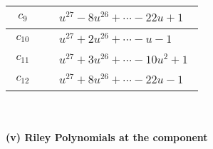 \documentclass[1p]{elsarticle_modified}
\theoremstyle{definition}
\begin{document}
\begin{tabular}{m{50pt}|m{274pt}}
\hline $$\begin{aligned}c_{9}\end{aligned}$$&$\begin{aligned}
&u^{27}-8 u^{26}+\cdots-22 u+1
\end{aligned}$\\
\hline $$\begin{aligned}c_{10}\end{aligned}$$&$\begin{aligned}
&u^{27}+2 u^{26}+\cdots- u-1
\end{aligned}$\\
\hline $$\begin{aligned}c_{11}\end{aligned}$$&$\begin{aligned}
&u^{27}+3 u^{26}+\cdots-10 u^2+1
\end{aligned}$\\
\hline $$\begin{aligned}c_{12}\end{aligned}$$&$\begin{aligned}
&u^{27}+8 u^{26}+\cdots-22 u-1
\end{aligned}$\\
\hline
\end{tabular}\\~\\
\newpage\renewcommand{\arraystretch}{1}
\flushleft \textbf{(v) Riley Polynomials at the component}\newline \\
\end{document}
